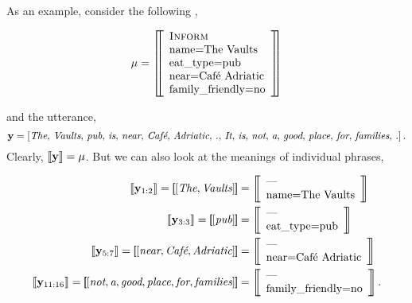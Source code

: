As an example, consider the following \meaningrepresentation,
\begin{singlespace}
\[
    \mu = \left[\!\!\left[ \begin{array}{l}
        \textsc{Inform} \\
        \textrm{name=The Vaults}\\
        \textrm{eat\_type=pub}\\
        \textrm{near=Caf{\'e} Adriatic}\\
        \textrm{family\_friendly=no}\\
\end{array}\right]\!\!\right] 
\]
\end{singlespace}
and the utterance,
\[\mathbf{y} = \left[ \textit{The},\,\textit{Vaults},\,\textit{pub},\,\textit{is},\,\textit{near},\,\textit{Caf{\'e}},\,\textit{Adriatic},\,\textit{.},\,\textit{It},\,\textit{is},\,\textit{not},\,\textit{a},\,\textit{good},\,\textit{place},\,\textit{for},\,\textit{families},\,\textit{.}\right]. \]
\noindent Clearly, $\left\llbracket \mathbf{y} \right\rrbracket = \mu$. But we can also look at the meanings of individual
phrases,\begin{singlespace}
    \begin{align*}
        \denotes{\utttoks_{1:2}} = \left[\!\!\left[ \left[\textit{The}, \textit{Vaults}  \right] \right]\!\!\right] & = \left[\!\!\left[
\begin{array}{l} \textrm{---} \\ \AV{name}{The Vaults}\end{array} \right]\!\!\right] \\
    \denotes{\utttoks_{3:3}} = \left[\!\!\left[ \left[\textit{pub}  \right] \right]\!\!\right] &= \left[\!\!\left[
\begin{array}{l} \textrm{---} \\ \AV{eat\_type}{pub}\end{array} \right]\!\!\right] \\
    \denotes{\utttoks_{5:7}} = \left[\!\!\left[ \left[\textit{near}, \textit{Caf{\'e}}, \textit{Adriatic}  \right] \right]\!\!\right] & = \left[\!\!\left[
\begin{array}{l} \textrm{---} \\ \AV{near}{Caf{\'e} Adriatic}\end{array} \right]\!\!\right] \\
    \denotes{\utttoks_{11:16}} = \left[\!\!\left[ \left[\textit{not}, \textit{a}, \textit{good}, \textit{place}, \textit{for}, \textit{families}  \right] \right]\!\!\right] & = \left[\!\!\left[
\begin{array}{l} \textrm{---} \\ \AV{family\_friendly}{no}\end{array} \right]\!\!\right]. 
\end{align*}
\end{singlespace}
